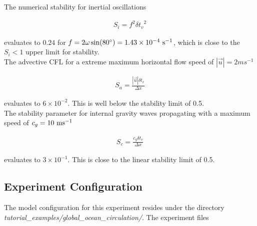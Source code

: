 \noindent The numerical stability for inertial oscillations
\cite{adcroft:95} 

\begin{eqnarray}
\label{EQ:eg-global-inertial_stability}
S_{i} = f^{2} {\delta t_v}^2
\end{eqnarray}

\noindent evaluates to $0.24$ for $f=2\omega\sin(80^{\circ})=1.43\times10^{-4}~{\rm s}^{-1}$, which is close to 
the $S_{i} < 1$ upper limit for stability.
\\

\noindent The advective CFL \cite{adcroft:95} for a extreme maximum 
horizontal flow
speed of $ | \vec{u} | = 2 ms^{-1}$

\begin{eqnarray}
\label{EQ:eg-global-cfl_stability}
S_{a} = \frac{| \vec{u} | \delta t_{v}}{ \Delta x}
\end{eqnarray}

\noindent evaluates to $6 \times 10^{-2}$. This is well below the stability 
limit of 0.5.
\\

\noindent The stability parameter for internal gravity waves propagating
with a maximum speed of $c_{g}=10~{\rm ms}^{-1}$
\cite{adcroft:95}

\begin{eqnarray}
\label{EQ:eg-global-gfl_stability}
S_{c} = \frac{c_{g} \delta t_{v}}{ \Delta x}
\end{eqnarray}

\noindent evaluates to $3 \times 10^{-1}$. This is close to the linear
stability limit of 0.5.
  
\subsection{Experiment Configuration}
\label{www:tutorials}
\label{SEC:eg-global-clim_ocn_examp_exp_config}

The model configuration for this experiment resides under the 
directory {\it tutorial\_examples/global\_ocean\_circulation/}.  
The experiment files 

